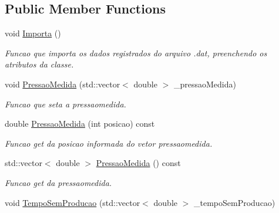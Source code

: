 \subsection*{Public Member Functions}
\begin{DoxyCompactItemize}
\item 
\hypertarget{classCDadosRegistradorPressao_af0d2c2b61c6300ff81918e294e19deb9}{void \hyperlink{classCDadosRegistradorPressao_af0d2c2b61c6300ff81918e294e19deb9}{Importa} ()}\label{classCDadosRegistradorPressao_af0d2c2b61c6300ff81918e294e19deb9}

\begin{DoxyCompactList}\small\item\em Funcao que importa os dados registrados do arquivo .dat, preenchendo os atributos da classe. \end{DoxyCompactList}\item 
\hypertarget{classCDadosRegistradorPressao_a3c044f2142c298c11d56a375979ff5fd}{void \hyperlink{classCDadosRegistradorPressao_a3c044f2142c298c11d56a375979ff5fd}{Pressao\-Medida} (std\-::vector$<$ double $>$ \-\_\-pressao\-Medida)}\label{classCDadosRegistradorPressao_a3c044f2142c298c11d56a375979ff5fd}

\begin{DoxyCompactList}\small\item\em Funcao que seta a pressaomedida. \end{DoxyCompactList}\item 
\hypertarget{classCDadosRegistradorPressao_adacef1440655206361ba87c6b0fd7b8c}{double \hyperlink{classCDadosRegistradorPressao_adacef1440655206361ba87c6b0fd7b8c}{Pressao\-Medida} (int posicao) const }\label{classCDadosRegistradorPressao_adacef1440655206361ba87c6b0fd7b8c}

\begin{DoxyCompactList}\small\item\em Funcao get da posicao informada do vetor pressaomedida. \end{DoxyCompactList}\item 
\hypertarget{classCDadosRegistradorPressao_a647d831edf3669d97b239484bede72ec}{std\-::vector$<$ double $>$ \hyperlink{classCDadosRegistradorPressao_a647d831edf3669d97b239484bede72ec}{Pressao\-Medida} () const }\label{classCDadosRegistradorPressao_a647d831edf3669d97b239484bede72ec}

\begin{DoxyCompactList}\small\item\em Funcao get da pressaomedida. \end{DoxyCompactList}\item 
\hypertarget{classCDadosRegistradorPressao_af715f0242826bcbee24183048bc85a17}{void \hyperlink{classCDadosRegistradorPressao_af715f0242826bcbee24183048bc85a17}{Tempo\-Sem\-Producao} (std\-::vector$<$ double $>$ \-\_\-tempo\-Sem\-Producao)}\label{classCDadosRegistradorPressao_af715f0242826bcbee24183048bc85a17}


\end{DoxyCompactItemize}
